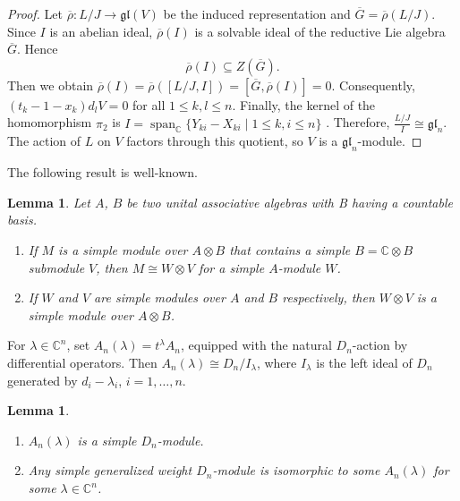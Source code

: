 \documentclass[12pt,a4paper]{amsart}
\newtheorem{lemma}[theorem]{Lemma}%
\numberwithin{equation}{section}
\newcommand{\C}{\mathbb C}
\begin{document}
\begin{proof}
Let
$\overline{\rho}\colon L/J\rightarrow\mathfrak{gl}(V)$
be the induced representation and
$\overline{G}=\overline{\rho}(L/J)$.
Since \(I\) is an abelian ideal, \(\overline{\rho}(I)\) is a solvable
ideal of the reductive Lie algebra \(\overline{G}\). Hence
\[
\overline{\rho}(I)\subseteq Z(\overline{G}).
\]
Then we obtain
$\overline{\rho}(I)
 =
 \overline{\rho}([L/J,I])
 =
 [\overline{G},\overline{\rho}(I)]
 =
 0$.
Consequently,
$(t_k-1-x_k)d_lV=0$ for all $1\leq k,l\leq n$.
Finally, the kernel of the homomorphism \(\pi_2\) is
$ I=
\operatorname{span}_{\mathbb C}
\{Y_{ki}-X_{ki}\mid 1\leq k,i\leq n\}$ .
Therefore, $\frac{L/J}{I}\cong\mathfrak{gl}_n$.
The action of \(L\) on \(V\) factors through this quotient, so \(V\)
is a \(\mathfrak{gl}_n\)-module.
\end{proof}



The following result is well-known.

\begin{lemma}\label{tensor proper}
Let $A$, $B$ be two unital associative algebras with B having a countable basis.
\begin{enumerate}
\item If $M$ is a simple module over $A\otimes B$ that contains a simple $B=\C\otimes B$ submodule $V$, then $M \cong W\otimes V$ for a simple $A$-module $W$.
\item If $W$ and $V$ are simple modules over $A$ and $B$ respectively, then $W\otimes V$ is a simple module over $A\otimes B$.
\end{enumerate}
\end{lemma}

For \(\lambda\in\C^n\), set \(A_n(\lambda)=t^\lambda A_n\), equipped
with the natural \(D_n\)-action by differential operators. Then
\(A_n(\lambda)\cong D_n/I_\lambda\), where \(I_\lambda\) is the left
ideal of \(D_n\) generated by \(d_i-\lambda_i\), \(i=1,\ldots,n\).

\begin{lemma}\label{A(lambda)}
\begin{enumerate}
\item $A_n(\lambda)$ is a simple $D_n$-module.
\item Any simple generalized weight $D_n$-module is isomorphic to some
$A_n(\lambda)$ for some $\lambda \in \C^n$.
\end{enumerate}
\end{lemma}
\end{document}
